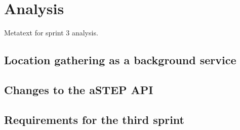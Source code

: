 \section{Analysis}
Metatext for sprint 3 analysis.

\subsection{Location gathering as a background service} \label{ssec:LocationGatherBGS}



\subsection{Changes to the aSTEP API}


\subsection{Requirements for the third sprint}

